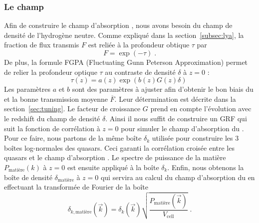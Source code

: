 \subsubsection{Le champ \lya{}}
Afin de construire le champ d'absorption \lya{}, nous avons besoin du champ de densité de l'hydrogène neutre. Comme expliqué dans la section~\ref{subsec:lya}, la fraction de flux transmis $F$ est reliée à la profondeur obtique $\tau$ par
\begin{equation}
  F = \exp(- \tau) \; .
\end{equation}
De plus, la formule FGPA (Fluctuating Gunn Peterson Approximation) permet de relier la profondeur optique $\tau$ au contraste de densité $\delta$ à $z = 0$ :
\begin{equation}
  \label{eq:fgpa1}
  \tau(z) = a(z) \exp(b(z) G(z) \delta) \;
\end{equation}
Les paramètres $a$ et $b$ sont des paramètres à ajuster afin d'obtenir le bon biais du \lya{} et la bonne transmission moyenne $\overline F$. Leur détermination est décrite dans la section~\ref{sec:tuning}. Le facteur de croissance $G$ prend en compte l'évolution avec le redshift du champ de densité $\delta$. Ainsi il nous suffit de construire un GRF qui suit la fonction de corrélation à $z=0$ pour simuler le champ d'absorption du \lya{}. Pour ce faire, nous partons de la même boîte $\delta_k$ utilisée pour construire les 3 boîtes log-normales des quasars. Ceci garanti la corrélation croisée entre les quasars et le champ d'absorption \lya{}. Le spectre de puissance de la matière $P_{\mathrm{matière}}(k)$ à $z=0$ est ensuite appliqué à la boîte $\delta_k$. Enfin, nous obtenons la boîte de densité $\delta_{\mathrm{matière}}$ à $z = 0$ qui servira au calcul du champ d'absorption du \lya{} en effectuant la transformée de Fourier de la boîte
\begin{equation}
  \delta_{k, \mathrm{matière}}(\vec k)  = \delta_k(\vec k) \sqrt{\frac{P_{\mathrm{matière}}(\vec k)}{V_{\mathrm{cell}}}} \; .
\end{equation}


